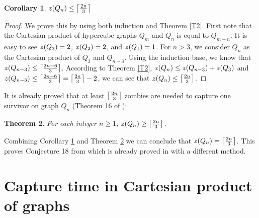 \documentclass[1p]{elsarticle}
\DeclarePairedDelimiter\ceil{\lceil}{\rceil} \DeclarePairedDelimiter\floor{\lfloor}{\rfloor}
\newtheorem{theorem}{Theorem}
\newtheorem{corollary}[theorem]{Corollary}
\newcommand{\zn}{\ooalign{$z$\cr\hfil\rule[.5ex]{.2em}{.08ex}\hfil\cr}}
\begin{document}
\begin{corollary}
	\label{C3}
	$\zn(Q_{n}) \leq \ceil*{\frac{2n}{3}}$
\end{corollary}
\begin{proof}
	We prove this by using both induction and Theorem \ref{T2}. First note that the Cartesian product of
	hypercube graphs $Q_{m}$ and $Q_{n}$ is equal to $Q_{m+n}$. It is easy to see $\zn(Q_3) = 2$, $\zn(Q_2) = 2$, and
	$\zn(Q_1) = 1$. For $n > 3$, we consider $Q_n$ as the Cartesian product of $Q_3$ and $Q_{n-3}$. Using the induction
	base, we know that $\zn(Q_{n-3}) \leq \ceil*{\frac{2n - 6}{3}}$. According to Theorem \ref{T2}, $\zn(Q_n) \leq
	\zn(Q_{n-3}) + \zn(Q_3)$ and $\zn(Q_{n-3}) \leq \ceil*{\frac{2n - 6}{3}} = \ceil*{\frac{2n}{3}} - 2$, we can see that
	$\zn(Q_n) \leq \ceil*{\frac{2n}{3}}$.
\end{proof}

It is already proved that at least $\ceil*{\frac{2n}{3}}$ zombies are needed to capture one survivor on graph $Q_n$
(Theorem 16 of \cite{Fitz16}):

\begin{theorem}
	\label{T4}
	For each integer $n \geq 1$, $\zn(Q_n) \geq \ceil*{\frac{2n}{3}} $.
\end{theorem}

Combining Corollary \ref{C3} and Theorem \ref{T4} we can conclude that $\zn(Q_n) = \ceil*{\frac{2n}{3}}$.
This proves Conjecture 18 from \cite{Fitz16} which is already proved in \cite{Offner19} with a different method. 
	

\section{Capture time in Cartesian product of graphs}\label{capturetime} 
\end{document}
